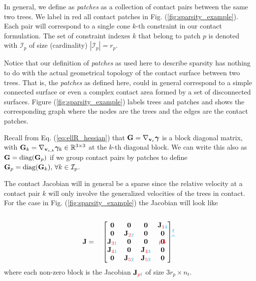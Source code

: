 In general, we define as \textit{patches} as a collection of contact pairs
between the same two trees. We label in red all contact patches in Fig.
(\ref{fig:sparsity_example}). Each pair will correspond to a single cone
$k\text{-th}$ constraint in our contact formulation. The set of constraint
indexes $k$ that belong to patch $p$ is denoted with $\mathcal{I}_p$ of size
(cardinality) $|\mathcal{I}_p| = r_p$.

Notice that our definition of \textit{patches} as used here to describe sparsity
has nothing to do with the actual geometrical topology of the contact surface
between two trees. That is, the \textit{patches} as defined here, could in
general correspond to a simple connected surface or even a complex contact area
formed by a set of disconnected surfaces. Figure (\ref{fig:sparsity_example})
labels trees and patches and shows the corresponding graph where the nodes are
the trees and the edges are the contact patches.

Recall from Eq. (\ref{eq:ellR_hessian}) that ${\mathbf{G}} = \nabla_{{\mathbf{v}}_c}{\bm\gamma}$
is a block diagonal matrix, with ${\mathbf{G}}_k = \nabla_{{\mathbf{v}}_{c,k}}{\bm\gamma}_k \in
\mathbb{R}^{3\times 3}$ at the $k\text{-th}$ diagonal block. We can write this
also as ${\mathbf{G}} = \text{diag}({\mathbf{G}}_p)$ if we group contact pairs by patches to
define ${\mathbf{G}}_p=\text{diag}({\mathbf{G}}_k), \,\forall k\in\mathcal{I}_p$.

The contact Jacobian will in general be a sparse since the relative velocity at
a contact pair $k$ will only involve the generalized velocities of the trees in
contact. For the case in Fig. (\ref{fig:sparsity_example}) the Jacobian will
look like\\\\
\begin{equation}
	\mf{J}=\quad
	\begin{bmatrix}
		\tikzmark{J_topleft}\mf{0} & 
		\mf{0} & \mf{0} & \mf{J}_{\rr{1}\cc{4}}\tikzmark{J_topright}\\		
		\mf{0} & \mf{J}_{\rr{2}\cc{2}} & \mf{0} & \mf{0}\\
		\mf{J}_{\rr{3}\cc{1}} & \mf{0} & \mf{0} & \mf{0}\\
		\mf{J}_{\rr{4}\cc{1}} & \mf{0} & \mf{J}_{\rr{4}\cc{3}} & \mf{0}\\
		\tikzmark{J_bottomleft}
		\mf{0} & \mf{J}_{\rr{5}\cc{2}} & \mf{J}_{\rr{5}\cc{3}} & \mf{0}		
	\end{bmatrix}
\tikz[overlay,remember picture] {
	\draw[->,thick,color=cyan]
  ([yshift=3ex]J_topleft) -- ([yshift=3ex]J_topright) node[midway,above]
  {\scriptsize $t$}; 
  \draw[->,thick,color=red]
  ([yshift=1.5ex,xshift=-3ex]J_topleft) -- ([xshift=-3ex]J_bottomleft)
  node[near end,left] {\scriptsize $p$};}	
\end{equation}
where each non-zero block is the Jacobian ${\mathbf{J}}_{{\color{red}p}{\color{cyan}t}}$ of size
$3r_p\times n_t$.

